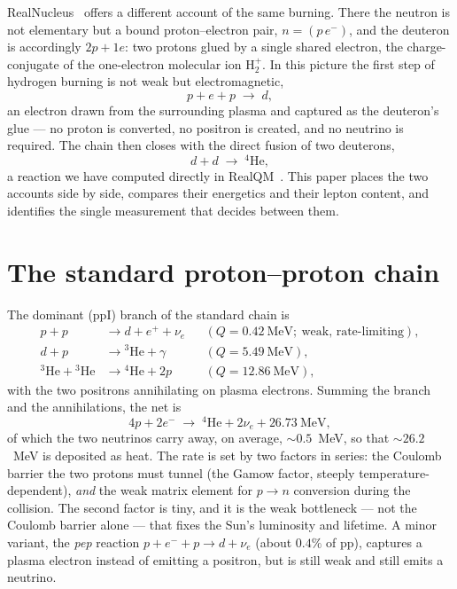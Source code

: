 \documentclass[11pt]{article}
\begin{document}
RealNucleus~\cite{Johnson-RealNucleus,Johnson-RealQM} offers a different account of the same burning.
There the neutron is not elementary but a bound proton--electron pair, $n=(p\,e^-)$, and the deuteron
is accordingly $2p+1e$: two protons glued by a single shared electron, the charge-conjugate of the
one-electron molecular ion $\mathrm{H}_2^{+}$. In this picture the first step of hydrogen burning is
not weak but electromagnetic,
\begin{equation}
p + e + p \;\longrightarrow\; d ,
\label{eq:pep}
\end{equation}
an electron drawn from the surrounding plasma and captured as the deuteron's glue --- no proton is
converted, no positron is created, and no neutrino is required. The chain then closes with the direct
fusion of two deuterons,
\begin{equation}
d + d \;\longrightarrow\; {}^4\mathrm{He} ,
\label{eq:dd}
\end{equation}
a reaction we have computed directly in RealQM~\cite{Johnson-RealNucleus}. This paper places the two
accounts side by side, compares their energetics and their lepton content, and identifies the single
measurement that decides between them.

\section{The standard proton--proton chain}

The dominant (ppI) branch of the standard chain is
\begin{align}
p + p &\to d + e^{+} + \nu_e && (Q = 0.42~\text{MeV};\ \text{weak, rate-limiting}),\\
d + p &\to {}^3\mathrm{He} + \gamma && (Q = 5.49~\text{MeV}),\\
{}^3\mathrm{He} + {}^3\mathrm{He} &\to {}^4\mathrm{He} + 2p && (Q = 12.86~\text{MeV}),
\end{align}
with the two positrons annihilating on plasma electrons. Summing the branch and the annihilations, the
net is
\begin{equation}
4p + 2e^- \;\longrightarrow\; {}^4\mathrm{He} + 2\nu_e + 26.73~\text{MeV},
\label{eq:standard-net}
\end{equation}
of which the two neutrinos carry away, on average, ${\sim}0.5$~MeV, so that ${\sim}26.2$~MeV is
deposited as heat. The rate is set by two factors in series: the Coulomb barrier the two protons must
tunnel (the Gamow factor, steeply temperature-dependent), \emph{and} the weak matrix element for
$p\to n$ conversion during the collision. The second factor is tiny, and it is the weak bottleneck ---
not the Coulomb barrier alone --- that fixes the Sun's luminosity and lifetime. A minor variant, the
\emph{pep} reaction $p+e^-+p\to d+\nu_e$ (about $0.4\%$ of pp), captures a plasma electron instead of
emitting a positron, but is still weak and still emits a neutrino.
\end{document}
